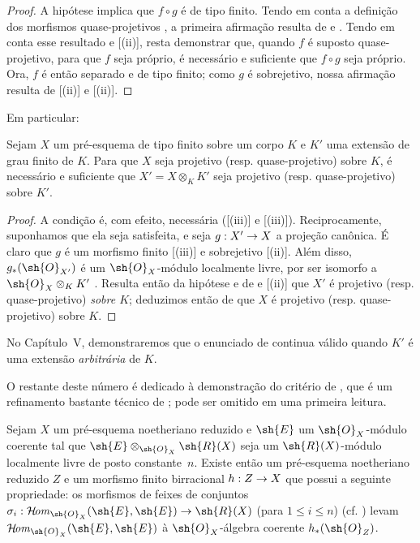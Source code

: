 \documentclass[oneside,10pt]{amsart}
\makeatletter
\renewcommand{\leq}{\leqslant}
\newcommand{\ega@arrow}[2]{\mathchoice{#1}{#2}{#2}{#2}}
\renewcommand{\to}{\ega@arrow{\longrightarrow}{\rightarrow}}
\def\shHom{\mathcal{H}\!\mathit{om}}
\let\EGAOriginalLabel\label
\renewcommand{\label}[1]{\phantomsection\EGAOriginalLabel{#1}}
\makeatother
\begin{document}
\begin{proof}
A hipótese implica que $f\circ g$ é de tipo finito.
Tendo em conta a definição dos morfismos quase-projetivos , a primeira afirmação resulta de  e .
Tendo em conta esse resultado e [(ii)], resta demonstrar que, quando $f$ é suposto quase-projetivo, para que $f$ seja próprio, é necessário e suficiente que $f\circ g$ seja próprio.
Ora, $f$ é então separado  e de tipo finito;
como $g$ é sobrejetivo, nossa afirmação resulta de [(ii)] e [(ii)].
\end{proof}

Em particular:

\begin{corollary}[6.6.5]
\label{II.6.6.5}
Sejam $X$ um pré-esquema de tipo finito sobre um corpo $K$ e $K'$ uma extensão de grau finito de $K$.
Para que $X$ seja projetivo (resp. quase-projetivo) sobre $K$, é necessário e suficiente que $X'=X\otimes_K K'$ seja projetivo (resp. quase-projetivo) sobre $K'$.
\end{corollary}

\begin{proof}
A condição é, com efeito, necessária ([(iii)] e [(iii)]).
Reciprocamente, suponhamos que ela seja satisfeita, e seja $g:X'\to X$ a projeção canônica.
É claro que $g$ é um morfismo finito [(iii)] e sobrejetivo [(ii)].
Além disso, $g_*(\sh{O}_{X'})$ é um $\sh{O}_X$-módulo localmente livre, por ser isomorfo a $\sh{O}_X\otimes_K K'$ .
Resulta então da hipótese e de  e [(ii)] que $X'$ é projetivo (resp. quase-projetivo) \emph{sobre $K$};
deduzimos então de  que $X$ é projetivo (resp. quase-projetivo) sobre $K$.
\end{proof}

No Capítulo~V, demonstraremos que o enunciado de  continua válido quando $K'$ é uma extensão \emph{arbitrária} de $K$.

O restante deste número é dedicado à demonstração do critério de , que é um refinamento bastante técnico de ;
pode ser omitido em uma primeira leitura.

\begin{lemma}[6.6.6]
\label{II.6.6.6}
Sejam $X$ um pré-esquema noetheriano reduzido e $\sh{E}$ um $\sh{O}_X$-módulo coerente tal que $\sh{E}\otimes_{\sh{O}_X}\sh{R}(X)$ seja um $\sh{R}(X)$-módulo localmente livre de posto constante~$n$.
Existe então um pré-esquema noetheriano reduzido $Z$ e um morfismo finito birracional $h:Z\to X$ que possui a seguinte propriedade: os morfismos de feixes de conjuntos $\sigma_i:\shHom_{\sh{O}_X}(\sh{E},\sh{E})\to\sh{R}(X)$ (para $1\leq i\leq n$) (cf. ) levam $\shHom_{\sh{O}_X}(\sh{E},\sh{E})$ à $\sh{O}_X$-álgebra coerente $h_*(\sh{O}_Z)$.
\end{lemma}
\end{document}
